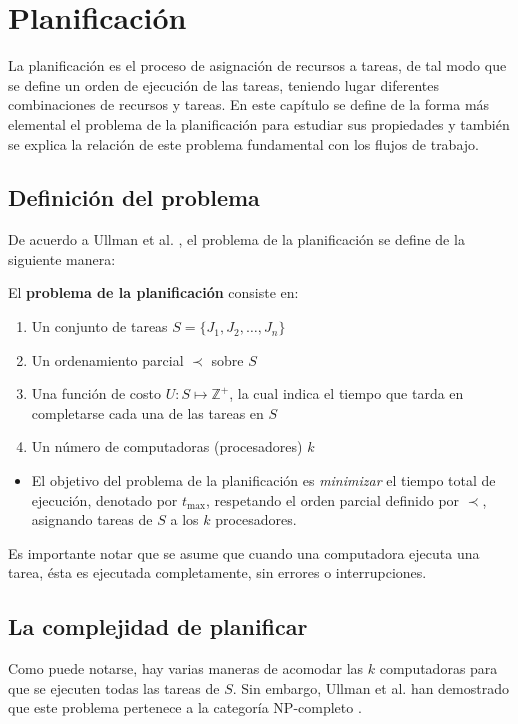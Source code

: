 \chapter{Planificación}
La planificación
es el proceso de asignación de recursos a tareas, de tal modo que se define un orden de ejecución de las tareas, teniendo lugar diferentes combinaciones de recursos y tareas. En este capítulo se define de la forma más elemental el problema de la planificación para estudiar sus propiedades y también se explica la relación de este problema fundamental con los flujos de trabajo.


\section{Definición del problema}
De acuerdo a  Ullman et al. \cite{ullman1975np}, el problema de la planificación se define de la siguiente manera: 

\begin{defn}
El \textbf{problema de la planificación} consiste en:
\begin{enumerate}
\item Un conjunto de tareas $S = \{ J_1, J_2, \dots, J_n \}$
\item Un ordenamiento parcial $\prec$ sobre $S$
\item Una función de costo $U: S \mapsto \mathbb{Z}^{+}$, la cual indica el tiempo que tarda en completarse cada una de las tareas en $S$
\item Un número de computadoras (procesadores) $k$
\end{enumerate}
\begin{itemize}
\item El objetivo del problema de la planificación es \emph{minimizar} el tiempo total de ejecución, denotado por $t_\text{max}$, respetando el orden parcial definido por $\prec$, asignando tareas de $S$ a los $k$ procesadores.
\end{itemize}
Es importante notar que se asume que cuando una computadora ejecuta una tarea, ésta es ejecutada completamente, sin errores o interrupciones.
\end{defn}


\section{La complejidad de planificar}
Como puede notarse, hay varias maneras de acomodar las $k$ computadoras para que se ejecuten todas las tareas de $S$. Sin embargo, Ullman et al. han demostrado que este problema pertenece a la categoría NP-completo \cite{ullman1975np}.

